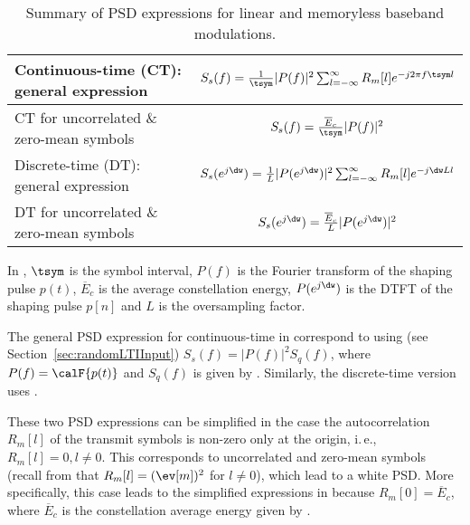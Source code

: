 \begin{table}
\centering
\caption{Summary of PSD expressions for linear and memoryless baseband modulations.\label{tab:psdExpressions}}
\begin{tabular}{|l|c|}
\hline
Continuous-time (CT): general expression & $S_s(f) = \frac{1}{\tsym} |P(f)|^2 \sum_{l=-\infty}^{\infty} R_m[l] e^{-j 2 \pi f \tsym l}$ \\
\hline
CT for uncorrelated \& zero-mean symbols & $S_s(f) = \frac{\overline E_c}{\tsym} |P(f)|^2$ \\
\hline \hline
Discrete-time (DT): general expression & $S_s(e^{j \dw}) = \frac{1}{L} |P(e^{j \dw})|^2 \sum_{l=-\infty}^{\infty} R_m[l] e^{-j \dw L l}$ \\
\hline
DT for uncorrelated \& zero-mean symbols & $S_s(e^{j \dw}) = \frac{\overline E_c}{L}  |P(e^{j \dw})|^2$ \\
\hline
\end{tabular}
\end{table}

In , $\tsym$ is the symbol interval, $P(f)$ is the Fourier transform of the shaping pulse $p(t)$, $\overline E_c$ is the average constellation energy, $P(e^{j \dw})$ is the DTFT of the shaping pulse $p[n]$ and $L$ is the oversampling factor. 

The general PSD expression for continuous-time in  correspond to 
using (see Section~\ref{sec:randomLTIInput}) $S_s(f) = |P(f)|^2 S_q(f)$, where $P(f) = \calF \{ p(t)\}$ and $S_q(f)$ is given by .
Similarly, the discrete-time version uses . 

These two PSD expressions can be simplified in the case the autocorrelation $R_m[l]$ of the transmit symbols is non-zero only at the origin, i.\,e., $R_m[l]=0, l \ne 0$. This corresponds to uncorrelated and zero-mean symbols (recall from  that $R_m[l]=(\ev[m])^2$ for $l \ne 0$), which lead to a white PSD. 
More specifically, this case leads to the simplified expressions in  because $R_m[0]=\overline E_c$, where $\overline E_c$ is the constellation average energy given by .


